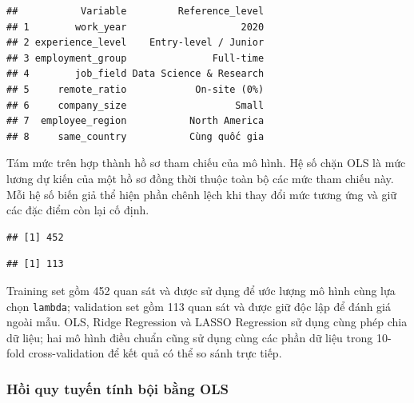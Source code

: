 \begin{verbatim}
##           Variable         Reference_level
## 1        work_year                    2020
## 2 experience_level    Entry-level / Junior
## 3 employment_group               Full-time
## 4        job_field Data Science & Research
## 5     remote_ratio            On-site (0%)
## 6     company_size                   Small
## 7  employee_region           North America
## 8     same_country           Cùng quốc gia
\end{verbatim}

Tám mức trên hợp thành hồ sơ tham chiếu của mô hình. Hệ số chặn OLS là
mức lương dự kiến của một hồ sơ đồng thời thuộc toàn bộ các mức tham
chiếu này. Mỗi hệ số biến giả thể hiện phần chênh lệch khi thay đổi mức
tương ứng và giữ các đặc điểm còn lại cố định.

\begin{verbatim}
## [1] 452
\end{verbatim}

\begin{verbatim}
## [1] 113
\end{verbatim}

Training set gồm 452 quan sát và được sử dụng để ước lượng mô hình cùng
lựa chọn \texttt{lambda}; validation set gồm 113 quan sát và được giữ
độc lập để đánh giá ngoài mẫu. OLS, Ridge Regression và LASSO Regression
sử dụng cùng phép chia dữ liệu; hai mô hình điều chuẩn cũng sử dụng cùng
các phần dữ liệu trong 10-fold cross-validation để kết quả có thể so
sánh trực tiếp.

\subsubsection{Hồi quy tuyến tính bội bằng
OLS}\label{nghi:hux1ed3i-quy-tuyux1ebfn-tuxednh-bux1ed9i-bux1eb1ng-ols}

